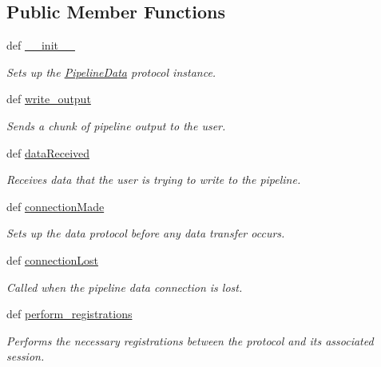 \subsection*{Public Member Functions}
\begin{DoxyCompactItemize}
\item 
def \hyperlink{classhwm_1_1network_1_1protocols_1_1data_1_1_pipeline_data_ac3dfd691e6237cfaa2fdae4197518071}{\-\_\-\-\_\-init\-\_\-\-\_\-}
\begin{DoxyCompactList}\small\item\em Sets up the \hyperlink{classhwm_1_1network_1_1protocols_1_1data_1_1_pipeline_data}{Pipeline\-Data} protocol instance. \end{DoxyCompactList}\item 
def \hyperlink{classhwm_1_1network_1_1protocols_1_1data_1_1_pipeline_data_a9099afa62c9ce4fc18d75092f18d6f3d}{write\-\_\-output}
\begin{DoxyCompactList}\small\item\em Sends a chunk of pipeline output to the user. \end{DoxyCompactList}\item 
def \hyperlink{classhwm_1_1network_1_1protocols_1_1data_1_1_pipeline_data_a2025a02a3697d0baa7a0d8884fd04edb}{data\-Received}
\begin{DoxyCompactList}\small\item\em Receives data that the user is trying to write to the pipeline. \end{DoxyCompactList}\item 
def \hyperlink{classhwm_1_1network_1_1protocols_1_1data_1_1_pipeline_data_a21ff6145ca078501cc457f3b3ee25ee1}{connection\-Made}
\begin{DoxyCompactList}\small\item\em Sets up the data protocol before any data transfer occurs. \end{DoxyCompactList}\item 
\hypertarget{classhwm_1_1network_1_1protocols_1_1data_1_1_pipeline_data_a04dbdf4b7c0e0ade9e40c54bfa6028cf}{def \hyperlink{classhwm_1_1network_1_1protocols_1_1data_1_1_pipeline_data_a04dbdf4b7c0e0ade9e40c54bfa6028cf}{connection\-Lost}}\label{classhwm_1_1network_1_1protocols_1_1data_1_1_pipeline_data_a04dbdf4b7c0e0ade9e40c54bfa6028cf}

\begin{DoxyCompactList}\small\item\em Called when the pipeline data connection is lost. \end{DoxyCompactList}\item 
def \hyperlink{classhwm_1_1network_1_1protocols_1_1data_1_1_pipeline_data_ab817fdf1e9a2d1f3b391416e40c73315}{perform\-\_\-registrations}
\begin{DoxyCompactList}\small\item\em Performs the necessary registrations between the protocol and its associated session. \end{DoxyCompactList}\end{DoxyCompactItemize}
